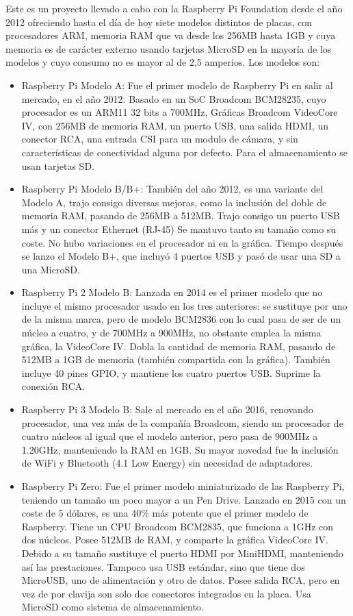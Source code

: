 Este es un proyecto llevado a cabo con la Raspberry Pi Foundation\cite{RaspberryPi} desde el año 2012 ofreciendo hasta el día de hoy siete modelos distintos de placas, con procesadores ARM, memoria RAM que va desde los 256MB hasta 1GB y cuya memoria es de carácter externo usando tarjetas MicroSD en la mayoría de los modelos y cuyo consumo no es mayor al de 2,5 amperios. Los modelos son:
\begin{itemize}
\item Raspberry Pi Modelo A: Fue el primer modelo de Raspberry Pi en salir al mercado, en el año 2012. Basado en un SoC Broadcom BCM28235, cuyo procesador es un ARM11 32 bits a 700MHz, Gráficas Broadcom VideoCore IV, con 256MB de memoria RAM, un puerto USB, una salida HDMI, un conector RCA, una entrada CSI para un modulo de cámara, y sin características de conectividad alguna por defecto. Para el almacenamiento se usan tarjetas SD. 
\item Raspberry Pi Modelo B/B+: También del año 2012, es una variante del Modelo A, trajo consigo diversas mejoras, como la inclusión del doble de memoria RAM, pasando de 256MB a 512MB. Trajo consigo un puerto USB más y un conector Ethernet (RJ-45) Se mantuvo tanto su tamaño como su coste. No hubo variaciones en el procesador ni en la gráfica. Tiempo después se lanzo el Modelo B+, que incluyó 4 puertos USB y pasó de usar una SD a una MicroSD.
\item Raspberry Pi 2 Modelo B: Lanzada en 2014 es el primer modelo que no incluye el mismo procesador usado en los tres anteriores: se sustituye por uno de la misma marca, pero de modelo BCM2836 con lo cual pasa de ser de un núcleo a cuatro, y de 700MHz a 900MHz, no obstante emplea la misma gráfica, la VideoCore IV. Dobla la cantidad de memoria RAM, pasando de 512MB a 1GB de memoria (también compartida con la gráfica). También incluye 40 pines GPIO, y mantiene los cuatro puertos USB. Suprime la conexión RCA.
\item Raspberry Pi 3 Modelo B: Sale al mercado en el año 2016, renovando procesador, una vez más de la compañía Broadcom, siendo un procesador de cuatro núcleos al igual que el modelo anterior, pero pasa de 900MHz a 1.20GHz,  manteniendo la RAM en 1GB. Su mayor novedad fue la inclusión de WiFi y Bluetooth (4.1 Low Energy) sin necesidad de adaptadores.
\item Raspberry Pi Zero: Fue el primer modelo miniaturizado de las Raspberry Pi, teniendo un tamaño un poco mayor a un Pen Drive. Lanzado en 2015 con un coste de 5 dólares, es una 40\% más potente que el primer modelo de Raspberry. Tiene un CPU Broadcom BCM2835, que funciona a 1GHz con dos núcleos. Posee 512MB de RAM, y comparte la gráfica VideoCore IV. Debido a su tamaño sustituye el puerto HDMI por MiniHDMI, manteniendo así las prestaciones. Tampoco usa USB estándar, sino que tiene dos MicroUSB, uno de alimentación y otro de datos. Posee salida RCA, pero en vez de por clavija son solo dos conectores integrados en la placa. Usa MicroSD como sistema de almacenamiento.

\end{itemize}
